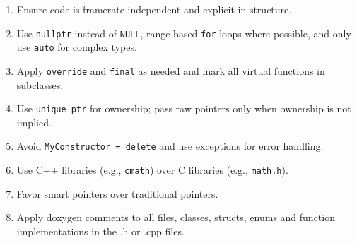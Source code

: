 \documentclass{article}
\begin{document}
\begin{enumerate}[left=0pt, align=left]
    \item Ensure code is framerate-independent and explicit in structure.

    \item Use \texttt{nullptr} instead of \texttt{NULL}, range-based \texttt{for} loops where possible, and only use \texttt{auto} for complex types.

    \item Apply \texttt{override} and \texttt{final} as needed and mark all virtual functions in subclasses.

    \item Use \texttt{unique\_ptr} for ownership; pass raw pointers only when ownership is not implied.

    \item Avoid \texttt{MyConstructor = delete} and use exceptions for error handling.

    \item Use C++ libraries (e.g., \texttt{cmath}) over C libraries (e.g., \texttt{math.h}).

    \item Favor smart pointers over traditional pointers.
    
    \item Apply doxygen comments to all files, classes, structs, enums and function implementations in the .h or .cpp files.

\end{enumerate}
\end{document}
